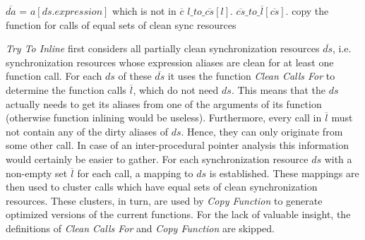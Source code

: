 \begin{algorithmic}
\State {}
 
  \State $\overline{da}$ = $a[ds.\mathit{expression}]$ which is not in $\overline{c}$ 
   
    \State $l\_to\_\overline{cs}[l]$. 
  \EndFor
\EndFor
{} 
  \State $\overline{cs}\_to\_\overline{l}[\overline{cs}]$.
\EndFor
{} \Comment copy the function for calls of equal sets of clean sync resources
  \State {}
\EndFor
\EndFunction
\end{algorithmic}
\textit{Try To Inline} first considers all partially clean synchronization resources $\overline{ds}$, i.e. synchronization resources whose expression aliases are clean for at least one function call. For each $ds$ of these $\overline{ds}$ it uses the function \textit{Clean Calls For} to determine the function calls $\overline{l}$, which do not need $ds$. This means that the $ds$ actually needs to get its aliases from one of the arguments of its function (otherwise function inlining would be useless). Furthermore, every call in $\overline{l}$ must not contain any of the dirty aliases of $ds$. Hence, they can only originate from some other call. In case of an inter-procedural pointer analysis this information would certainly be easier to gather. For each synchronization resource $ds$ with a non-empty set $\overline{l}$ for each call, a mapping to $ds$ is established. These mappings are then used to cluster calls which have equal sets of clean synchronization resources. These clusters, in turn, are used by \textit{Copy Function} to generate optimized versions of the current functions. For the lack of valuable insight, the definitions of \textit{Clean Calls For} and \textit{Copy Function} are skipped.

